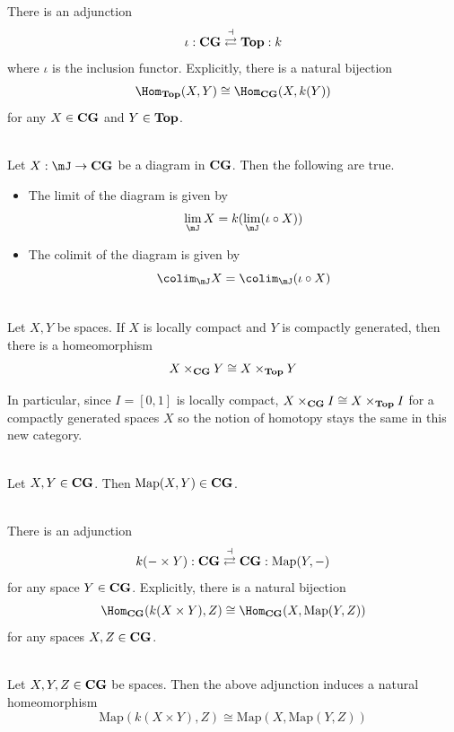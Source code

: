 \documentclass[a4paper]{article}
\begin{document}
\begin{prp}{}{}\\
There is an adjunction $$\iota:\bold{CG}\overset{\dashv}{\rightleftarrows}\bold{Top}:k$$ where $\iota$ is the inclusion functor. Explicitly, there is a natural bijection $$\Hom_\bold{Top}(X,Y)\cong\Hom_\bold{CG}(X,k(Y))$$ for any $X\in\bold{CG}$ and $Y\in\bold{Top}$. 
\end{prp}

\begin{prp}{}{}\\
Let $X:\mJ\to\bold{CG}$ be a diagram in $\bold{CG}$. Then the following are true. 
\begin{itemize}
\item The limit of the diagram is given by $$\lim_\mJ X=k(\lim_\mJ(\iota\circ X))$$
\item The colimit of the diagram is given by $$\colim_\mJ X=\colim_\mJ(\iota\circ X)$$
\end{itemize}
\end{prp}

\begin{lmm}{}{}\\
Let $X,Y$ be spaces. If $X$ is locally compact and $Y$ is compactly generated, then there is a homeomorphism $$X\times_{\bold{CG}}Y\cong X\times_{\bold{Top}}Y$$
\end{lmm}

In particular, since $I=[0,1]$ is locally compact, $X\times_{\bold{CG}}I\cong X\times_{\bold{Top}}I$ for a compactly generated spaces $X$ so the notion of homotopy stays the same in this new category. 

\begin{prp}{}{}\\
Let $X,Y\in\bold{CG}$. Then $\text{Map}(X,Y)\in\bold{CG}$. 
\end{prp}

\begin{prp}{}{}\\
There is an adjunction $$k(-\times Y):\bold{CG}\overset{\dashv}{\rightleftarrows}\bold{CG}:\text{Map}(Y,-)$$ for any space $Y\in\bold{CG}$. Explicitly, there is a natural bijection $$\Hom_\bold{CG}(k(X\times Y),Z)\cong\Hom_\bold{CG}(X,\text{Map}(Y,Z))$$ for any spaces $X,Z\in\bold{CG}$. 
\end{prp}

\begin{prp}{}{}\\
Let $X,Y,Z\in\bold{CG}$ be spaces. Then the above adjunction induces a natural homeomorphism $$\text{Map}(k(X\times Y),Z)\cong\text{Map}(X,\text{Map}(Y,Z))$$
\end{prp}
\end{document}
